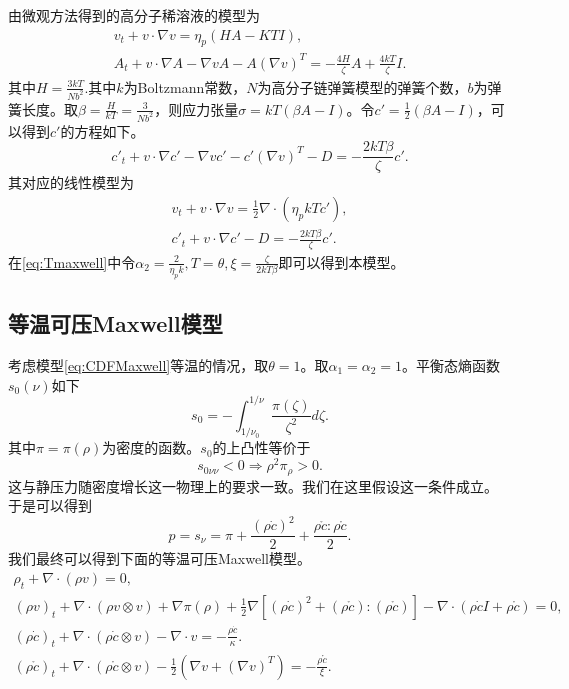 	由微观方法得到的高分子稀溶液的模型为 \cite{le2009multiscale,larson1999structure}
	\begin{eqnarray*}
		v_t + v \cdot \nabla v = \eta_p (H A - KT I), \\
		A_t + v \cdot \nabla A - \nabla v A - A(\nabla v)^T  = -\frac{4 H}{\zeta} A+ \frac{4kT}{\zeta} I.
	\end{eqnarray*}
	其中$H = \frac{3kT}{Nb^2}$.其中$k$为Boltzmann常数，$N$为高分子链弹簧模型的弹簧个数，$b$为弹簧长度。取$\beta = \frac{H}{kT} = \frac{3}{Nb^2}$，则应力张量$\sigma = k T(\beta A-I)$。令$c'=\frac{1}{2}(\beta A-I)$，可以得到$c'$的方程如下。
	\begin{equation}\label{eq:MicroUCM}
		c'_t + v \cdot \nabla c'- \nabla v c' - c'(\nabla v)^T -  D  = -\frac{2 kT \beta}{\zeta} c'.
	\end{equation}
	其对应的线性模型为
	\begin{eqnarray*}
		v_t + v \cdot \nabla v = \frac{1}{2} \nabla \cdot (\eta_p kT c'), \\
		c'_t + v \cdot \nabla c' -  D  = -\frac{2 kT \beta}{\zeta} c'.
	\end{eqnarray*}
	在\eqref{eq:Tmaxwell}中令$\alpha_2 = \frac{2}{\eta_p k}, T = \theta,\xi = \frac{\zeta}{2 kT \beta}$即可以得到本模型。

	\subsection{等温可压Maxwell模型}
	考虑模型\eqref{eq:CDFMaxwell}等温的情况，取$\theta=1$。取$\alpha_1=\alpha_2=1$。平衡态熵函数$s_0(\nu)$如下
	\begin{equation*}
		s_0 = - \int_{1/\nu_0}^{1/\nu} \frac{\pi(\zeta)}{\zeta^2} d\zeta.
	\end{equation*}
	其中$\pi=\pi(\rho)$为密度的函数。$s_0$的上凸性等价于
	\begin{equation*}
		s_{0\nu \nu} < 0 \Rightarrow \rho^2 \pi_\rho >0.
	\end{equation*}
	这与静压力随密度增长这一物理上的要求一致。我们在这里假设这一条件成立。
	于是可以得到
	\begin{equation}
		p = s_{\nu}= \pi + \frac{(\rho \dot{c})^2}{2} + \frac{\rho \mathring{c}:\rho \mathring{c}}{2}.
	\end{equation}
	我们最终可以得到下面的等温可压Maxwell模型。
	\begin{subequations}\label{eq:CDFalphaConst}
		\begin{align}
			\rho_t + \nabla \cdot (\rho v) = 0, \\
			(\rho v)_t + \nabla \cdot (\rho v \otimes v) + \nabla \pi(\rho) + \frac{1}{2} \nabla [ (\rho \dot{c})^2+ (\rho \mathring{c}) : (\rho \mathring{c})]- \nabla \cdot ( \rho \dot{c} I +  \rho \mathring{c}) = 0, \\
			(\rho \dot{c})_t  + \nabla \cdot(\rho \dot{c} \otimes v) -  \nabla \cdot v = - \frac{\rho \dot{c}}{\kappa}. \\
			(\rho \mathring{c})_t + \nabla \cdot (\rho \mathring{c} \otimes v) - \frac{1}{2} (\nabla v + (\nabla v)^T) = - \frac{\rho \mathring{c}}{\xi}.
		\end{align}
	\end{subequations}

